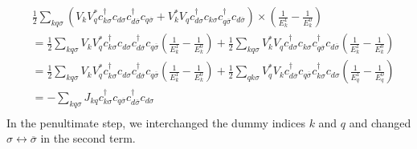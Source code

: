 \begin{equation}\begin{aligned}
&\frac{1}{2}\sum_{kq\sigma}\left(V_k V_q^* c^\dagger_{k\sigma}c_{d\sigma} c^\dagger_{d\overline\sigma}c_{q\overline\sigma} + V^*_k V_q c^\dagger_{d\sigma}c_{k\sigma} c^\dagger_{q\overline\sigma}c_{d\overline\sigma}\right)\times\left(\frac{1}{E_k^1} - \frac{1}{E_k^0}\right)\\
&=\frac{1}{2}\sum_{kq\sigma}V_k V_q^* c^\dagger_{k\sigma}c_{d\sigma} c^\dagger_{d\overline\sigma}c_{q\overline\sigma}\left(\frac{1}{E_k^1} - \frac{1}{E_k^0}\right) + \frac{1}{2}\sum_{kq\sigma}V^*_k V_q c^\dagger_{d\sigma}c_{k\sigma} c^\dagger_{q\overline\sigma}c_{d\overline\sigma}\left(\frac{1}{E_k^1} - \frac{1}{E_k^0}\right)\\
&=\frac{1}{2}\sum_{kq\sigma}V_k V_q^* c^\dagger_{k\sigma}c_{d\sigma} c^\dagger_{d\overline\sigma}c_{q\overline\sigma}\left(\frac{1}{E_k^1} - \frac{1}{E_k^0}\right) + \frac{1}{2}\sum_{qk\sigma}V^*_q V_k c^\dagger_{d\overline\sigma}c_{q\overline\sigma} c^\dagger_{k\sigma}c_{d\sigma}\left(\frac{1}{E_q^1} - \frac{1}{E_q^0}\right)\\
&=-\sum_{kq\sigma}J_{kq} c^\dagger_{k\sigma}c_{q\overline\sigma}c^\dagger_{d\overline\sigma}c_{d\sigma} \\
\end{aligned}\end{equation}
In the penultimate step, we interchanged the dummy indices \(k\) and \(q\) and changed \(\sigma \leftrightarrow \overline\sigma\) in the second term. 

